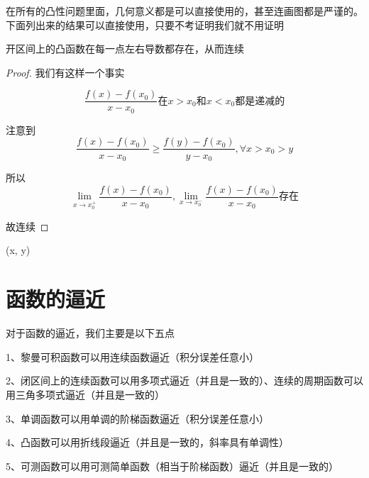 \documentclass[lang=cn,10pt]{elegantbook}
\begin{document}
	在所有的凸性问题里面，几何意义都是可以直接使用的，甚至连画图都是严谨的。下面列出来的结果可以直接使用，只要不考证明我们就不用证明
	\begin{theorem}
		开区间上的凸函数在每一点左右导数都存在，从而连续
	\end{theorem}
	\begin{proof}
		我们有这样一个事实
		
		\begin{equation*}
			\frac{f\left( x \right) -f\left( x_0 \right)}{x-x_0}\text{在}x>x_0\text{和}x<x_0\text{都是递减的}
		\end{equation*}
		
		注意到
		\begin{equation*}
			\frac{f\left( x \right) -f\left( x_0 \right)}{x-x_0}\ge \frac{f\left( y \right) -f\left( x_0 \right)}{y-x_0},\forall x>x_0>y
		\end{equation*}
		
		所以
		\begin{equation*}
			\underset{x\rightarrow x_{0}^{+}}{\lim}\frac{f\left( x \right) -f\left( x_0 \right)}{x-x_0},\underset{x\rightarrow x_{0}^{-}}{\lim}\frac{f\left( x \right) -f\left( x_0 \right)}{x-x_0}\text{存在}
		\end{equation*}
		
		故连续
	\end{proof}
(x, y)	\section{函数的逼近}
	
	对于函数的逼近，我们主要是以下五点
	
	1、黎曼可积函数可以用连续函数逼近（积分误差任意小）
	
	2、闭区间上的连续函数可以用多项式逼近（并且是一致的）、连续的周期函数可以用三角多项式逼近（并且是一致的）
	
	3、单调函数可以用单调的阶梯函数逼近（积分误差任意小）
	
	4、凸函数可以用折线段逼近（并且是一致的，斜率具有单调性）
	
	5、可测函数可以用可测简单函数（相当于阶梯函数）逼近（并且是一致的）
	
\end{document}
